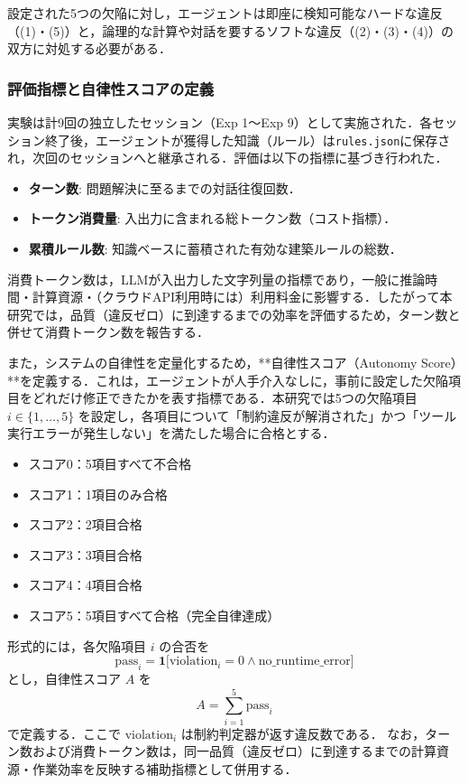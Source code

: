 \documentclass[dvipdfmx, a4paper, 9pt]{deimj}
\begin{document}
設定された5つの欠陥に対し，エージェントは即座に検知可能なハードな違反（(1)・(5)）と，論理的な計算や対話を要するソフトな違反（(2)・(3)・(4)）の双方に対処する必要がある．

\subsubsection{評価指標と自律性スコアの定義}

実験は計9回の独立したセッション（Exp 1〜Exp 9）として実施された．各セッション終了後，エージェントが獲得した知識（ルール）は\texttt{rules.json}に保存され，次回のセッションへと継承される．評価は以下の指標に基づき行われた．

\begin{itemize}
    \item \textbf{ターン数}: 問題解決に至るまでの対話往復回数．
    \item \textbf{トークン消費量}: 入出力に含まれる総トークン数（コスト指標）．
    \item \textbf{累積ルール数}: 知識ベースに蓄積された有効な建築ルールの総数．
\end{itemize}

消費トークン数は，LLMが入出力した文字列量の指標であり，一般に推論時間・計算資源・（クラウドAPI利用時には）利用料金に影響する．したがって本研究では，品質（違反ゼロ）に到達するまでの効率を評価するため，ターン数と併せて消費トークン数を報告する．

また，システムの自律性を定量化するため，**自律性スコア（Autonomy Score）**を定義する．これは，エージェントが人手介入なしに，事前に設定した欠陥項目をどれだけ修正できたかを表す指標である．本研究では5つの欠陥項目 $i \in \{1,\dots,5\}$ を設定し，各項目について「制約違反が解消された」かつ「ツール実行エラーが発生しない」を満たした場合に合格とする．

\begin{itemize}
    \item スコア0：5項目すべて不合格
    \item スコア1：1項目のみ合格
    \item スコア2：2項目合格
    \item スコア3：3項目合格
    \item スコア4：4項目合格
    \item スコア5：5項目すべて合格（完全自律達成）
\end{itemize}

形式的には，各欠陥項目 $i$ の合否を
\begin{equation}
\text{pass}_i = \mathbf{1}\big[\text{violation}_i = 0 \land \text{no\_runtime\_error}\big]
\end{equation}
とし，自律性スコア $A$ を
\begin{equation}
A = \sum_{i=1}^{5}\text{pass}_i
\end{equation}
で定義する．ここで $\text{violation}_i$ は制約判定器が返す違反数である．
なお，ターン数および消費トークン数は，同一品質（違反ゼロ）に到達するまでの計算資源・作業効率を反映する補助指標として併用する．
\end{document}
